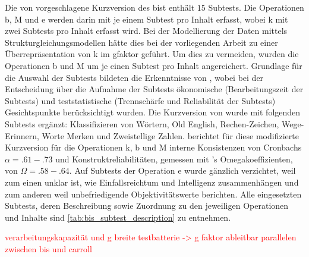 \documentclass[11pt, twoside, a4paper]{book}		%
\begin{document}
Die von \citet{Jaeger1997} vorgeschlagene Kurzversion des \gls{bist} enthält $15$ Subtests. Die Operationen \gls{b}, \gls{M} und \gls{e} werden darin mit je einem Subtest pro Inhalt erfasst, wobei \gls{k} mit zwei Subtests pro Inhalt erfasst wird. Bei der Modellierung der Daten mittels Strukturgleichungsmodellen hätte dies bei der vorliegenden Arbeit zu einer Überrepräsentation von \gls{k} im \gls{gfaktor} geführt. Um dies zu vermeiden, wurden die Operationen \gls{b} und \gls{M} um je einen Subtest pro Inhalt angereichert. Grundlage für die Auswahl der Subtests bildeten die Erkenntnisse von \citet{Wicki2014}, wobei bei der Entscheidung über die Aufnahme der Subtests ökonomische (Bearbeitungszeit der Subtests) und teststatistische (Trennschärfe und Reliabilität der Subtests)  Gesichtspunkte berücksichtigt wurden. Die Kurzversion von \citet{Jaeger1997} wurde mit folgenden Subtests ergänzt: Klassifizieren von Wörtern, Old English, Rechen-Zeichen, Wege-Erinnern, Worte Merken und Zweistellige Zahlen. 
\citet{Wicki2014} berichtet für diese modifizierte Kurzversion für die Operationen \gls{k}, \gls{b} und \gls{M} interne Konsistenzen von Cronbachs $\alpha=.61-.73$ und Konstruktreliabilitäten, gemessen mit \citeauthor{McDonald1999}'s \citeyearpar{McDonald1999} Omegakoeffizienten, von $\Omega = .58-.64$.
Auf Subtests der Operation \gls{e} wurde gänzlich verzichtet, weil zum einen unklar ist, wie Einfallsreichtum und Intelligenz zusammenhängen \citep{Kim2005} und zum anderen weil \citet{Jaeger1997} unbefriedigende Objektivitätswerte berichten. 
Alle eingesetzten Subtests, deren Beschreibung sowie Zuordnung zu den jeweiligen Operationen und Inhalte sind \autoref{tab:bis_subtest_description} zu entnehmen.

\textcolor{red}{verarbeitungskapazität und g
	breite testbatterie -> g faktor ableitbar
	parallelen zwischen bis und carroll}
\end{document}

